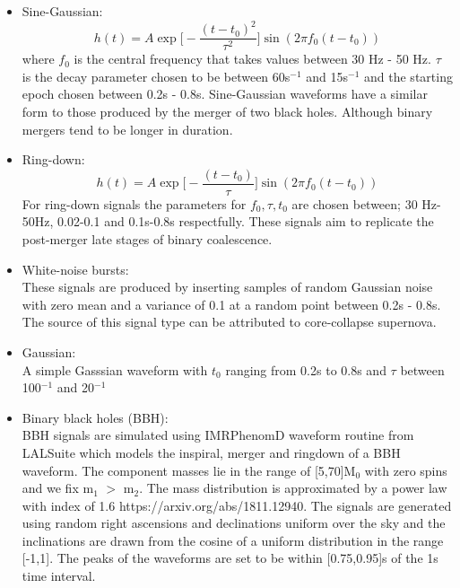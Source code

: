 \documentclass[12pt]{iopart}
\begin{document}
\begin{itemize}
	\item Sine-Gaussian:
		\begin{equation}
		\label{eqn:sg}
			h(t) = A \exp\bigg[ - \frac{(t-t_{0})^2}{\tau^2} \bigg] \sin (2 \pi f_0 (t-t_0))
		\end{equation}	
		where $f_0$ is the central frequency that takes values between 30 Hz - 50 Hz. $\tau$ is the decay parameter chosen to be between 60s$^{-1}$  and 15s$^{-1}$ and the starting epoch chosen between 0.2s - 0.8s. Sine-Gaussian waveforms have a similar form to those produced by the merger of two black holes. Although binary mergers tend to be longer in duration.  		
	\item Ring-down:
		\begin{equation}
			h(t) = A \exp \bigg[-\frac{(t-t_0)}{\tau}\bigg]\sin(2 \pi f_0 (t-t_0))
		\end{equation}
		For ring-down signals the parameters for $f_0, \tau, t_0$ are chosen between; 30 Hz-50Hz, 0.02-0.1 and 0.1s-0.8s respectfully. These signals aim to replicate the post-merger late stages of binary coalescence.
	\item White-noise bursts:\hfill \\
	These signals are produced by inserting samples of random Gaussian noise with zero mean and a variance of 0.1 at a random point between 0.2s - 0.8s. The source of this signal type can be attributed to core-collapse supernova. 
	\item Gaussian:\\
	A simple Gasssian waveform with $t_0$ ranging from 0.2s to 0.8s and $\tau$ between  100$^{-1}$ and 20$^{-1}$
	\item Binary black holes (BBH): \\
	BBH signals are simulated using IMRPhenomD waveform routine from LALSuite which models the inspiral, merger and ringdown of a BBH waveform. The component masses lie in the range of [5,70]M$_0$ with zero spins and we fix m$_1$ $>$ m$_2$. The mass distribution is approximated by a power law with index of 1.6 https://arxiv.org/abs/1811.12940. The signals are generated using random right ascensions and declinations uniform over the sky and the inclinations are drawn from the cosine of a uniform distribution in the range [-1,1]. The peaks of the waveforms are set to be within [0.75,0.95]s of the 1s time interval. 
\end{itemize}
\end{document}
